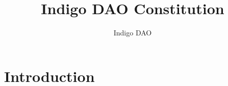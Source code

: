 \documentclass{article}
\title{Indigo DAO Constitution}
\author{Indigo DAO}
\date{}
\begin{document}
\begin{sloppypar}

\renewcommand*\contentsname{Table of Contents}

\maketitle

\tableofcontents

\hypertarget{introduction}{%
\section{Introduction}\label{introduction}}



\end{sloppypar}
\end{document}
